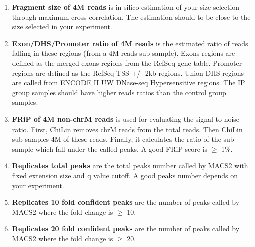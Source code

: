 \documentclass[9pt]{article}
\begin{document}
\begin{enumerate}
\item{\textbf{Fragment size of 4M reads} is in silico estimation of your size selection through maximum cross correlation. The estimation should to be close to the size selected in your experiment.}
\item{\textbf{Exon/DHS/Promoter ratio of 4M reads} is the estimated ratio of reads falling in these regions (from a 4M reads sub-sample). Exons regions are defined as the merged exons regions from the RefSeq gene table. Promoter regions are defined as the RefSeq TSS +/- 2kb regions. Union DHS regions are called from ENCODE II UW DNase-seq Hypersensitive regions. The IP group samples should have higher reads ratios than the control group samples.}

\item{\textbf{FRiP\cite{Landt2012} of 4M non-chrM reads} is used for evaluating the signal to noise ratio. First, ChiLin removes chrM reads from the total reads. Then ChiLin sub-samples 4M of these reads. Finally, it calculates the ratio of the sub-sample which fall under the called peaks. A good FRiP score is $\geq$ 1$\%$}.

 \item{\textbf{Replicates total peaks} are the total peaks number called by MACS2 with fixed extension size and q value cutoff. A good peaks number depends on your experiment.}
 \item{\textbf{Replicates 10 fold confident peaks} are the number of peaks called by MACS2 where the fold change is $\geq$ 10.}
 \item{\textbf{Replicates 20 fold confident peaks} are the number of peaks called by MACS2 where the fold change is $\geq$ 20.}   


\end{enumerate}
\end{document}
